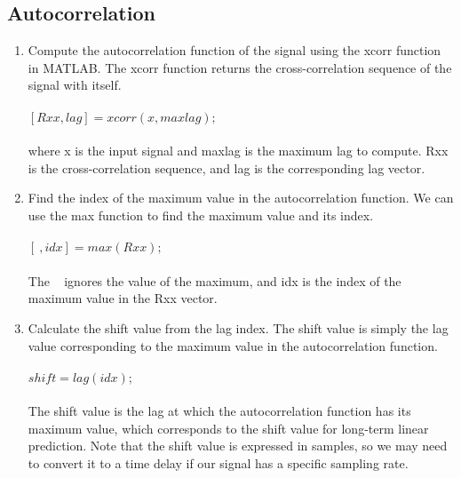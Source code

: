         \subsection{Autocorrelation} \label{subsec:acorr}
        \begin{enumerate}
            \item Compute the autocorrelation function of the signal using the xcorr function in MATLAB.
            The xcorr function returns the cross-correlation sequence of the signal with itself.\\
            \\
            $[Rxx, lag] = xcorr(x, maxlag);$\\
            \\
            where x is the input signal and maxlag is the maximum lag to compute. Rxx is the cross-correlation
            sequence, and lag is the corresponding lag vector.
            \item Find the index of the maximum value in the autocorrelation function. We can use the max function to
            find the maximum value and its index.\\
            \\
            $[~, idx] = max(Rxx);$\\
            \\
            The ~ ignores the value of the maximum, and idx is the index of the maximum value in the Rxx vector.
            \item Calculate the shift value from the lag index. The shift value is simply the lag value
            corresponding to the maximum value in the autocorrelation function.\\
            \\
            $shift = lag(idx);$\\
            \\
            The shift value is the lag at which the autocorrelation function has its maximum value, which
            corresponds to the shift value for long-term linear prediction. Note that the shift value is expressed in
            samples, so we may need to convert it to a time delay if our signal has a specific sampling rate.
        \end{enumerate}
